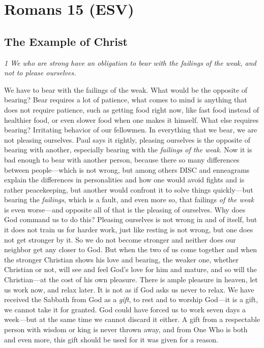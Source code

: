 \hypertarget{romans-15-esv}{%
\section{Romans 15 (ESV)}\label{romans-15-esv}}
\vspace{10.5cm}
\subsection{The Example of Christ} \emph{1 We who are strong have an
obligation to bear with the failings of the weak, and not to please
ourselves.}

We have to bear with the failings of the weak. What would be the
opposite of bearing? Bear requires a lot of patience, what comes to mind
is anything that does not require patience, such as getting food right
now, like fast food instead of healthier food, or even slower food when
one makes it himself. What else requires bearing? Irritating behavior of
our fellowmen. In everything that we bear, we are not pleasing
ourselves. Paul says it rightly, pleasing ourselves is the opposite of
bearing with another, especially bearing with the \emph{failings of the
weak}. Now it is bad enough to bear with another person, because there
so many differences between people---which is not wrong, but among
others DISC and enneagrams explain the differences in personalities and
how one would avoid fights and is rather peacekeeping, but another would
confront it to solve things quickly---but bearing the \emph{failings},
which is a fault, and even more so, that failings \emph{of the weak} is
even worse---and opposite all of that is the pleasing of ourselves. Why
does God command us to do this? Pleasing ourselves is not wrong in and
of itself, but it does not train us for harder work, just like resting
is not wrong, but one does not get stronger by it. So we do not become
stronger and neither does our neighbor get any closer to God. But when
the two of us come together and when the stronger Christian shows his
love and bearing, the weaker one, whether Christian or not, will see and
feel God's love for him and mature, and so will the Christian---at the
cost of his own pleasure. There is ample pleasure in heaven, let us work
now, and relax later. It is not as if God asks us never to relax. We
have received the Sabbath from God as a \emph{gift}, to rest and to
worship God---it is a gift, we cannot take it for granted. God could
have forced us to work seven days a week---but at the same time we
cannot discard it either. A gift from a respectable person with wisdom
or king is never thrown away, and from One Who is both and even more,
this gift should be used for it was given for a reason.

